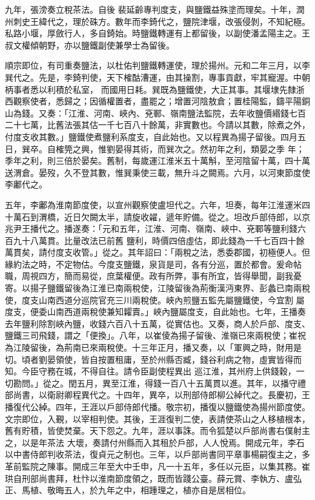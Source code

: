 \begin{pinyinscope}
 九年，張滂奏立稅茶法。自後
 裴延齡專判度支，與鹽鐵益殊塗而理矣。十年，潤州刺史王緯代之，理於硃方。數年而李錡代之，鹽院津堰，改張侵剝，不知紀極。私路小堰，厚斂行人，多自錡始。時鹽鐵轉運有上都留後，以副使潘孟陽主之。王叔文權傾朝野，亦以鹽鐵副使兼學士為留後。



 順宗即位，有司重奏鹽法，以杜佑判鹽鐵轉運使，理於揚州。元和二年三月，以李巽代之。先是，李錡判使，天下榷酤漕運，由其操割，專事貢獻，牢其寵渥。中朝柄事者悉以利積於私室，
 而國用日耗。巽既為鹽鐵使，大正其事。其堰埭先隸浙西觀察使者，悉歸之；因循權置者，盡罷之；增置河陰敖倉；置桂陽監，鑄平陽銅山為錢。又奏：「江淮、河南、峽內、兗鄆、嶺南鹽法監院，去年收鹽價緡錢七百二十七萬，比舊法張其估一千七百八十餘萬，非實數也。今請以其數，除煮之外，付度支收其數。」鹽鐵使煮鹽利系度支，自此始也。又以程異為揚子留後。四月五日，巽卒。自榷筦之興，惟劉晏得其術，而巽次之。然初年之利，類晏之季
 年；季年之利，則三倍於晏矣。舊制，每歲運江淮米五十萬斛，至河陰留十萬，四十萬送渭倉。晏歿，久不登其數，惟巽秉使三載，無升斗之闕焉。六月，以河東節度使李鄘代之。



 五年，李鄘為淮南節度使，以宣州觀察使盧坦代之。六年，坦奏，每年江淮運米四十萬石到渭橋，近日欠闕太半，請旋收糴，遞年貯備。從之。坦改戶部侍郎，以京兆尹王播代之。播遂奏：「元和五年，江淮、河南、嶺南、峽中、兗鄆等鹽利錢六百九十八萬貫。比量改法已前舊
 鹽利，時價四倍虛估，即此錢為一千七百四十餘萬貫矣，請付度支收管。」從之。其年詔曰：「兩稅之法，悉委郡國，初極便人。但緣約法之時，不定物估。今度支鹽鐵，泉貨是司，各有分巡，置於都會。爰命帖職，周視四方，簡而易從，庶葉權便。政有所弊，事有所宜，皆得舉聞，副我憂寄。以揚子鹽鐵留後為江淮已南兩稅使，江陵留後為荊衡漢沔東界、彭蠡已南兩稅使，度支山南西道分巡院官充三川兩稅使。峽內煎鹽五監先屬鹽鐵使，今宜割
 屬度支，便委山南西道兩稅使兼知糶賣。」峽內鹽屬度支，自此始也。七年，王播奏去年鹽利除割峽內鹽，收錢六百八十五萬，從實估也。又奏，商人於戶部、度支、鹽鐵三司飛錢，謂之「便換」。八年，以崔倰為揚子留後、淮嶺已來兩稅使；崔祝為江陵留後，為荊南已來兩稅使。十三年正月，播又奏，以「軍興之時，財用是切。頃者劉晏領使，皆自按置租庸，至於州縣否臧，錢谷利病之物，虛實皆得而知。今臣守務在城，不得自往。請令臣副使程異出
 巡江淮，其州府上供錢穀，一切勘問。」從之。閏五月，異至江淮，得錢一百八十五萬貫以進。其年，以播守禮部尚書，以衛尉卿程異代之。十四年，異卒，以刑部侍郎柳公綽代之。長慶初，王播復代公綽。四年，王涯以戶部侍郎代播。敬宗初，播復以鹽鐵使為揚州節度使。文宗即位，入覲，以宰相判使。其後，王涯復判二使，表請使茶山之人移植根本，舊有貯積，皆使焚棄。天下怨之。九年，涯以事誅。而令狐楚以戶部尚書右僕射主之，以是年茶法
 大壞，奏請付州縣而入其租於戶部，人人悅焉。開成元年，李石以中書侍郎判收茶法，復貞元之制也。三年，以戶部尚書同平章事楊嗣復主之，多革前監院之陳事。開成三年至大中壬申，凡一十五年，多任以元臣，以集其務。崔珙自刑部尚書拜，杜忭以淮南節度領之，既而皆踐公臺。薛元賞、李執方、盧弘正、馬植、敬晦五人，於九年之中，相踵理之，植亦自是居相位。




\end{pinyinscope}

